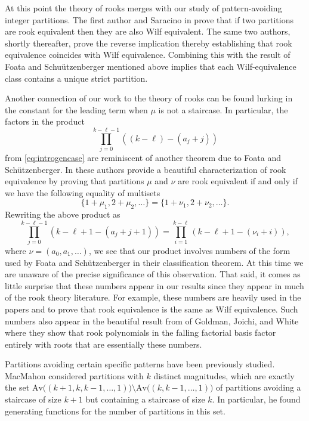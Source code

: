 \documentclass{article}
\theoremstyle{plain}
\theoremstyle{definition}
\newcommand{\Av}{\text{Av}}
\begin{document}
At this point the theory of rooks merges with our study of pattern-avoiding integer partitions.  The first author and Saracino in \cite{Bloom:Rook-2018} prove that if two partitions are rook equivalent then they are also Wilf equivalent.  The same two authors, shortly thereafter, prove \cite{Bloom:On-cr2018} the reverse implication thereby establishing that rook equivalence coincides with Wilf equivalence.  Combining this with the result of Foata and Schu\"{u}tzenberger mentioned above implies that each Wilf-equivalence class contains a unique strict partition. 

Another connection of our work to the theory of rooks can be found lurking in the constant for the leading term when $\mu$ is not a staircase.  In particular, the factors in the product  $$\prod_{j=0}^{k-\ell-1}\left((k-\ell) -(a_j+j)\right)$$ 
from \eqref{eq:introgencase} are reminiscent of another theorem due to Foata and Sch\"utzenberger.  In \cite{foata1970rook} these authors provide a beautiful characterization of rook equivalence by proving that partitions $\mu$ and $\nu$ are rook equivalent if and only if we have the following equality of multisets 
$$\{1+\mu_1, 2+\mu_2,\ldots\}=\{1+\nu_1, 2+\nu_2,\ldots\}.$$  
Rewriting the above product as 
$$\prod_{j=0}^{k-\ell-1}\left(k-\ell+1 -(a_j+j+1)\right)= \prod_{i=1}^{k-\ell}\left(k-\ell+1 -(\nu_i+i)\right),$$
where $\nu = (a_0,a_1,\ldots)$, we see that our product involves numbers of the form used by Foata and Sch\"utzenberger in their classification theorem.  At this time we are unaware of the precise significance of this observation.  That said, it comes as little surprise that these numbers appear in our results since they appear in much of the rook theory literature.  For example, these numbers are heavily used in the papers   \cite{Bloom:Rook-2018} and \cite{Bloom:On-cr2018} to prove that rook equivalence is the same as Wilf equivalence.  Such numbers also appear in the beautiful result from \cite{goldman1975rook} of Goldman, Joichi, and White where they show that rook polynomials in the falling factorial basis factor entirely with roots that are essentially these numbers.

Partitions avoiding certain specific patterns have been previously studied.  MacMahon \cite{MacMahon} considered partitions with $k$ distinct magnitudes, which are exactly the set  $\Av\big((k+1,k,k-1,\ldots,1)\big) \setminus \Av\big((k,k-1,\ldots,1)\big)$ of partitions avoiding a staircase of size $k+1$ but containing a staircase of size $k$.  In particular, he found generating functions for the number of partitions in this set.  
\end{document}
